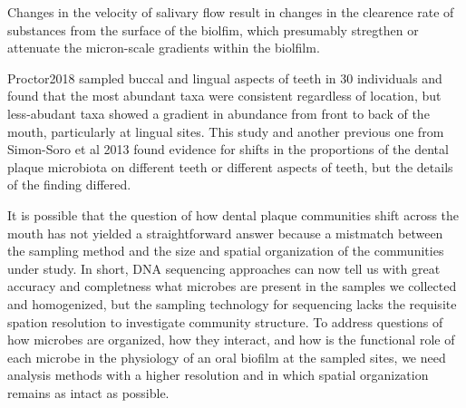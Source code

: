 Changes in the velocity of salivary flow result in changes in the clearence rate of substances from the surface of the 
biolfim, which presumably stregthen or attenuate the micron-scale gradients within the biolfilm.

Proctor2018 sampled buccal and lingual aspects of teeth in 30 individuals and found that the most abundant taxa were consistent 
regardless of location, but less-abudant taxa showed a gradient in abundance from front to back of the mouth, particularly 
at lingual sites. This study and another previous one from Simon-Soro et al 2013 found evidence for shifts in the proportions 
of the dental plaque microbiota on different teeth or different aspects of teeth, but the details of the finding differed.

It is possible that the question of how dental plaque communities shift across the mouth has not yielded a straightforward 
answer because a mistmatch between the sampling method and the size and spatial organization of the communities under study.
In short, DNA sequencing approaches can now tell us with great accuracy and completness what microbes are present in the samples 
we collected and homogenized, but the sampling technology for sequencing lacks the requisite spation resolution to investigate 
community structure. To address questions of how microbes are organized, how they interact, and how is the functional role of 
each microbe in the physiology of an oral biofilm at the sampled sites, we need analysis methods with a higher resolution and 
in which spatial organization remains as intact as possible.